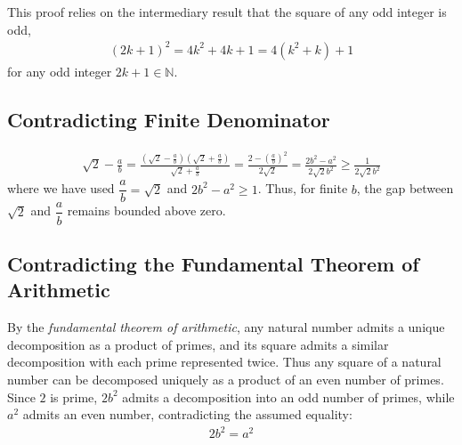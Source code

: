 \documentclass[12pt, a4]{article}
\begin{document}
This proof relies on the intermediary result that the square of any odd integer is odd, 
\begin{align*}
(2k+1)^2 = 4k^2 + 4k + 1 = 4(k^2 + k) + 1
\end{align*} 
for any odd integer $2k+1 \in \mathbb{N}$.

\subsection*{Contradicting Finite Denominator}

\begin{align*}
\sqrt{2} - \frac{a}{b} 
= \frac{\left(\sqrt{2} - \frac{a}{b}\right)\left(\sqrt{2} + \frac{a}{b}\right)}{\sqrt{2} + \frac{a}{b}} 
= \frac{2- \left(\frac{a}{b}\right)^2}{2\sqrt{2}} 
= \frac{2b^2- a^2}{2\sqrt{2}b^2} \geq \frac{1}{2\sqrt{2}b^2}
\end{align*}
where we have used $\dfrac{a}{b}=\sqrt{2}$ and $2b^2- a^2 \geq 1$. Thus, for finite $b$, the gap between $\sqrt{2}$ and $\dfrac{a}{b}$ remains bounded above zero. 

\subsection*{Contradicting the Fundamental Theorem of Arithmetic}
By the \textit{fundamental theorem of arithmetic}, any natural number admits a unique decomposition as a product of primes, and its square admits a similar decomposition with each prime represented twice. Thus any square of a natural number can be decomposed uniquely as a product of an even number of primes. Since $2$ is prime, $2b^2$ admits a decomposition into an odd number of primes, while $a^2$ admits an even number, contradicting the assumed equality:
\begin{align*}
2b^2 = a^2
\end{align*}
\end{document}
